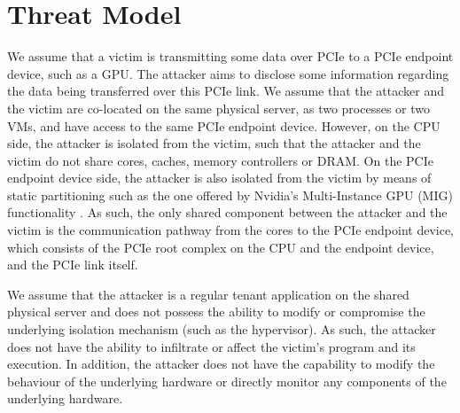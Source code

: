 \section{Threat Model}
\label{sec:interconnect-sc-threat-model}

We assume that a victim is transmitting some data over PCIe to a PCIe endpoint device, such as a GPU.
The attacker aims to disclose some information regarding the data being transferred over this PCIe link.
We assume that the attacker and the victim are co-located on the same physical server, as two processes or two VMs, and have access to the same PCIe endpoint device.
However, on the CPU side, the attacker is isolated from the victim, such that the attacker and the victim do not share cores, caches, memory controllers or DRAM.
On the PCIe endpoint device side, the attacker is also isolated from the victim by means of static partitioning such as the one offered by Nvidia's Multi-Instance GPU (MIG) functionality \cite{nvidia_mig_guide}.
As such, the only shared component between the attacker and the victim is the communication pathway from the cores to the PCIe endpoint device, which consists of the PCIe root complex on the CPU and the endpoint device, and the PCIe link itself.

We assume that the attacker is a regular tenant application on the shared physical server and does not possess the ability to modify or compromise the underlying isolation mechanism (such as the hypervisor).
As such, the attacker does not have the ability to infiltrate or affect the victim's program and its execution.
In addition, the attacker does not have the capability to modify the behaviour of the underlying hardware or directly monitor any components of the underlying hardware.
